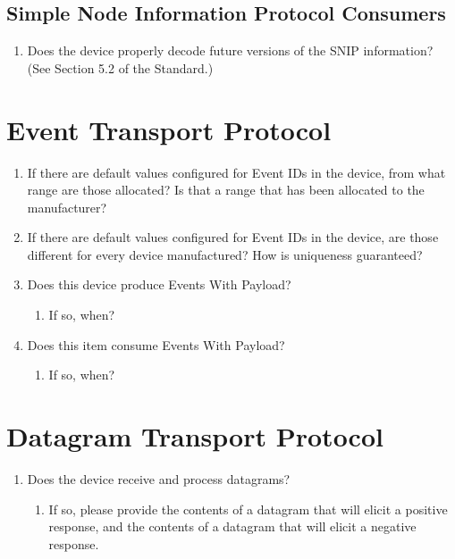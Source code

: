     \subsection{Simple Node Information Protocol Consumers}
        \begin{enumerate}
            \item Does the device properly decode future versions of the SNIP
                information? (See Section 5.2 of the Standard.)
        \end{enumerate}

\section{Event Transport Protocol}
    \begin{enumerate}
        \item If there are default values configured for Event IDs in the device,
            from what range are those allocated? Is that a range that has been
            allocated to the manufacturer?
        \item  If there are default values configured for Event IDs in the device,
            are those different for every device manufactured? How is uniqueness
            guaranteed?
        \item Does this device produce Events With Payload?  
            \begin{enumerate}
                \item If so, when?
            \end{enumerate}
        \item Does this item consume Events With Payload?
            \begin{enumerate}
                \item If so, when?
            \end{enumerate}
    \end{enumerate}

\section{Datagram Transport Protocol}
    \begin{enumerate}
        \item Does the device receive and process datagrams?
            \begin{enumerate}
                \item If so, please provide the contents of a datagram that
                    will elicit a positive response, and the contents of a 
                    datagram that will elicit a negative response.
            \end{enumerate}
    \end{enumerate}

